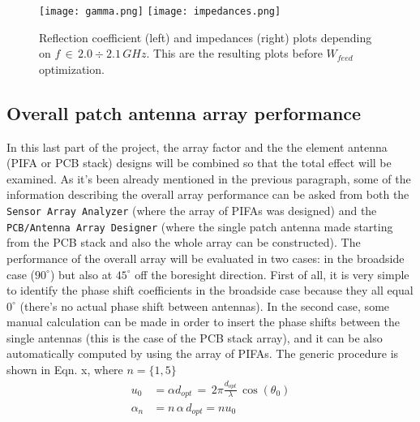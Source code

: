 \documentclass[12pt,a4paper]{article}
\begin{document}
{\begin{center}
	\begin{figure}
		\texttt{[image: gamma.png]}
		\texttt{[image: impedances.png]}
		\caption{Reflection coefficient (left) and impedances (right) plots depending on $f\,\in\,2.0\div 2.1\,GHz$. This are the resulting plots before $W_{feed}$ optimization. }
	\end{figure}
\end{center}
\subsection*{\selectfont\color{Turquoise}Overall patch antenna array performance}
In this last part of the project, the array factor and the the element antenna (PIFA or PCB stack) designs will be combined so that the total effect will be examined. As it's been already mentioned in the previous paragraph, some of the information describing the overall array performance can be asked from both the \texttt{\color{Mahogany}Sensor Array Analyzer} (where the array of PIFAs was designed) and the \texttt{\color{Mahogany}PCB/Antenna Array Designer} (where the single patch antenna made starting from the PCB stack and also the whole array can be constructed). The performance of the overall array will be evaluated in two cases: in the broadside case ($90^\circ$) but also at $45^\circ$ off the boresight direction. First of all, it is very simple to identify the phase shift coefficients in the broadside case because they all equal $0^\circ$ (there's no actual phase shift between antennas). In the second case, some manual calculation can be made in order to insert the phase shifts between the single antennas (this is the case of the PCB stack array), and it can be also automatically computed by using the array of PIFAs. The generic procedure is shown in Eqn. x, where $n=\{1,5\}$ 
\begin{equation}
	\begin{aligned}
		u_0&=\alpha d_{opt}\,=\,2\pi\frac{d_{opt}}{\lambda}\,\cos(\theta_0)\\
		\alpha_n&=n\,\alpha\,d_{opt}=nu_0
	\end{aligned}
\end{equation}
}
\end{document}
